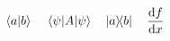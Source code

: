 \documentclass{article}
\begin{document}
\[ \bra{a} \ket{b} \quad \ev{A} {\psi} \quad \ketbra{a} {b} \quad \dv{f} {x} \]
\end{document}
